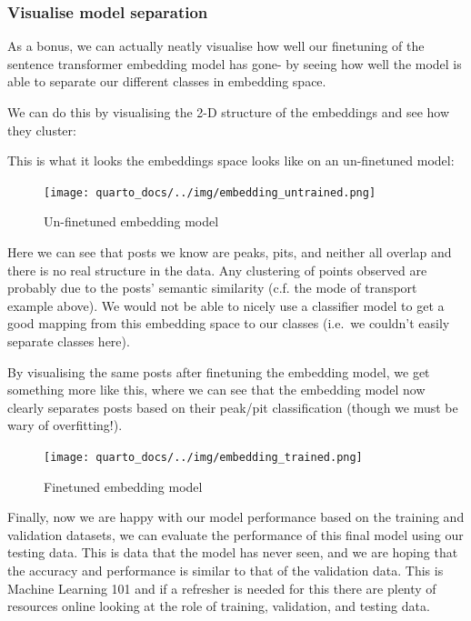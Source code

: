 \documentclass[
  letterpaper,
  DIV=11,
  numbers=noendperiod]{scrreprt}
\begin{document}
\subsubsection*{Visualise model
separation}\label{visualise-model-separation}

As a bonus, we can actually neatly visualise how well our finetuning of
the sentence transformer embedding model has gone- by seeing how well
the model is able to separate our different classes in embedding space.

We can do this by visualising the 2-D structure of the embeddings and
see how they cluster:

This is what it looks the embeddings space looks like on an un-finetuned
model:

\begin{figure}[H]

{\centering \texttt{[image: quarto\_docs/../img/embedding\_untrained.png]}

}

\caption{Un-finetuned embedding model}

\end{figure}%

Here we can see that posts we know are peaks, pits, and neither all
overlap and there is no real structure in the data. Any clustering of
points observed are probably due to the posts' semantic similarity (c.f.
the mode of transport example above). We would not be able to nicely use
a classifier model to get a good mapping from this embedding space to
our classes (i.e.~we couldn't easily separate classes here).

By visualising the same posts after finetuning the embedding model, we
get something more like this, where we can see that the embedding model
now clearly separates posts based on their peak/pit classification
(though we must be wary of overfitting!).

\begin{figure}[H]

{\centering \texttt{[image: quarto\_docs/../img/embedding\_trained.png]}

}

\caption{Finetuned embedding model}

\end{figure}%

Finally, now we are happy with our model performance based on the
training and validation datasets, we can evaluate the performance of
this final model using our testing data. This is data that the model has
never seen, and we are hoping that the accuracy and performance is
similar to that of the validation data. This is Machine Learning 101 and
if a refresher is needed for this there are plenty of resources online
looking at the role of training, validation, and testing data.
\end{document}
